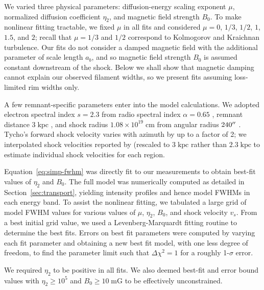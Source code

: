 \documentclass[iop, apj, numberedappendix]{emulateapj}
\newcommand*{\mt}{\mathrm}
\newcommand*{\unit}[1]{\;\mt{#1}}  %
\begin{document}
We varied three physical parameters: diffusion-energy scaling exponent $\mu$,
normalized diffusion coefficient $\eta_2$, and magnetic field strength $B_0$.
To make nonlinear fitting tractable, we fixed $\mu$ in all fits and considered
$\mu = 0$, $1/3$, $1/2$, $1$, $1.5$, and $2$; recall that $\mu = 1/3$ and $1/2$
correspond to Kolmogorov and Kraichnan turbulence.  Our fits do not consider
a damped magnetic field with the additional parameter of scale length $a_b$,
and so magnetic field strength $B_0$ is assumed constant downstream of the
shock.  Below we shall show that magnetic damping cannot explain our observed
filament widths, so we present fits assuming loss-limited rim widths only.

A few remnant-specific parameters enter into the model calculations.  We
adopted electron spectral index $s = 2.3$ from radio spectral index $\alpha =
0.65$ \citep{kothes2006},
remnant distance $3 \unit{kpc}$ \citep[cf.][]{hayato2010}, and shock radius
$1.08 \times 10^{19} \unit{cm}$ from angular radius $240\mbox{$^{\prime\prime}$}$
\citep{green2009}.  Tycho's forward shock velocity varies with azimuth by up to
a factor of 2; we interpolated shock velocities reported by
\citet{williams2013} (rescaled to $3 \unit{kpc}$ rather than $2.3 \unit{kpc}$
to estimate individual shock velocities for each region.

Equation~\eqref{eq:simp-fwhm} was directly fit to our measurements to obtain
best-fit values of $\eta_2$ and $B_0$.  The full model was numerically computed
as detailed in Section~\ref{sec:transport}, yielding intensity profiles and
hence model FWHMs in each energy band.  To assist the nonlinear
fitting, we tabulated a large grid of model FWHM values for various values of
$\mu$, $\eta_2$, $B_0$, and shock velocity $v_s$.  From a best initial grid
value, we used a Levenberg-Marquardt fitting routine to determine the best
fits.  Errors on best fit parameters were computed by varying each fit
parameter and obtaining a new best fit model, with one less degree of freedom,
to find the parameter limit such that $\Delta \chi^2 = 1$ for a roughly
1-$\sigma$ error.

We required $\eta_2$ to be positive in all fits.  We also deemed
best-fit and error bound values with $\eta_2 \geq 10^5$ and $B_0 \geq 10
\unit{mG}$ to be effectively unconstrained. %
\end{document}

